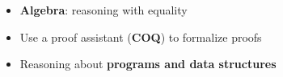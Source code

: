 \documentclass[12pt]{report}
\begin{document}
\begin{itemize}
\item  \textbf{Algebra}: reasoning with equality

\end{itemize}



\begin{itemize}
\item  Use a proof assistant (\textbf{COQ}) to formalize proofs

\end{itemize}



\begin{itemize}
\item  Reasoning about \textbf{programs and data structures}

\end{itemize}
\begin{coqdoccode}
\end{coqdoccode}
\end{document}
